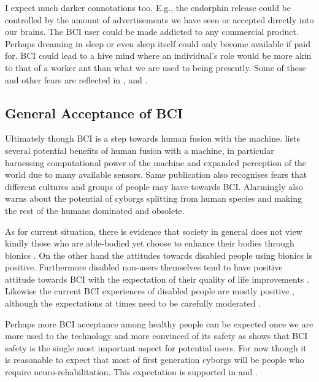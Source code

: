 \documentclass[fleqn,11pt]{olplainarticle}
\begin{document}
I expect much darker connotations too. E.g., the endorphin release could be controlled by the amount of advertisements we have seen or accepted directly into our brains. The BCI user could be made addicted to any commercial product. Perhaps dreaming in sleep or even sleep itself could only become available if paid for. BCI could lead to a hive mind where an individual's role would be more akin to that of a worker ant than what we are used to being presently. Some of these and other fears are reflected in \cite{liberatore_2021}, \cite{kogel2019using} and \cite{warwick2003cyborg}.

\subsection{General Acceptance of BCI}
Ultimately though BCI is a step towards human fusion with the machine. \cite{warwick2003cyborg} lists several potential benefits of human fusion with a machine, in particular harnessing computational power of the machine and expanded perception of the world due to many available sensors. Same publication also recognises fears that different cultures and groups of people may have towards BCI. Alarmingly \cite{warwick2003cyborg} also warns about the potential of cyborgs splitting from human species and making the rest of the humans dominated and obsolete.

As for current situation, there is evidence that society in general does not view kindly those who are able-bodied yet choose to enhance their bodies through bionics \cite {meyer2018disabled}. On the other hand the attitudes towards disabled people using bionics is positive. Furthermore disabled non-users themselves tend to have positive attitude towards BCI with the expectation of their quality of life improvements \cite{kogel2019using}. Likewise the current BCI experiences of disabled people are mostly positive \cite{kogel2020like}, although the expectations at times need to be carefully moderated \cite{glannon2014ethical}.

Perhaps more BCI acceptance among healthy people can be expected once we are more used to the technology and more convinced of its safety as \cite{kawala2021summary} shows that BCI safety is the single most important aspect for potential users. For now though it is reasonable to expect that most of first generation cyborgs will be people who require neuro-rehabilitation. This expectation is supported in \cite{schalk2008brain} and \cite{kogel2019using}.
\end{document}
